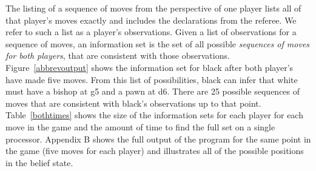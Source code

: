 \documentclass[11pt]{article}
\begin{document}
The listing of a sequence of moves from the perspective of one player lists all of that player's moves exactly and
includes the declarations from the referee.  We refer to such a list as a player's observations.  Given a list of
observations for a sequence of moves, an information set is the set of all possible {\em sequences of moves for both
players}, that are consistent with those observations.  Figure~\ref{abbrevoutput} shows the information set for black
after both player's have made five moves.  From this list of possibilities, black can infer that white must have a
bishop at g5 and a pawn at d6.  There are 25 possible sequences of moves that are consistent with black's observations
up to that point. Table~\ref{bothtimes} shows the size of the information sets for each player for each move in the game
and the amount of time to find the full set on a single processor.  Appendix B shows the full output of the program for
the same point in the game (five moves for each player) and illustrates all of the possible positions in the belief
state.
\end{document}
